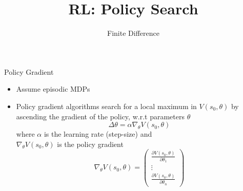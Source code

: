 


\title[RL: Finite Difference]{RL: Policy Search}
\subtitle{Finite Difference}




	
	\maketitle

\begin{frame}[c]{Policy Gradient}

\begin{itemize}
	\item Assume episodic MDPs 
	\item Policy gradient algorithms search for a \alert{local} maximum in $V(s_0,\theta)$ by ascending the gradient of the policy, w.r.t parameters $\theta$
	$$\Delta \theta = \alpha \nabla_\theta V(s_0, \theta) $$
	where $\alpha$ is the learning rate (step-size) and\\ $\nabla_\theta V(s_0, \theta)$ is the policy gradient
	$$\nabla_\theta V(s_0, \theta) = \begin{pmatrix}
	\frac{\partial V(s_0, \theta)}{\partial \theta_1}\\
	\vdots\\
	\frac{\partial V(s_0, \theta)}{\partial \theta_n}
	\end{pmatrix} $$
	
\end{itemize}

\end{frame}
